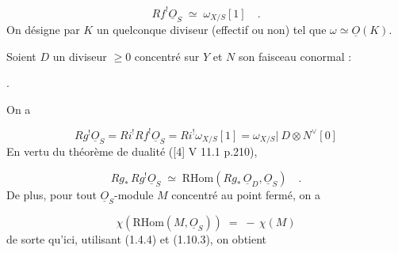 \begin{equation}\tag{1.10.1}
Rf^{!}\underline{O}_S \;\simeq\; \omega_{X/S}[1] \quad .
\end{equation}
On désigne par $K$ un quelconque diviseur (effectif ou non) tel que $\omega \simeq \underline{O}(K)$.

Soient $D$ un diviseur $\geq 0$ concentré sur $Y$ et $N$ son faisceau conormal :

\begin{center}
\quad .
\end{center}
On a

\begin{equation}\tag{1.10.2}
Rg^{!}\underline{O}_S = Ri^{!}Rf^{!}\underline{O}_S = Ri^{!}\omega_{X/S}[1] = \omega_{X/S}\big|\ D \otimes N^{\vee}[0]
\end{equation}
En vertu du théorème de dualité ([4] V 11.1 p.210),

\begin{equation}\tag{1.10.3}
Rg_{*}\, Rg^{!}\underline{O}_S \;\simeq\; \mathrm{RHom}(Rg_{*}\, \underline{O}_D,\underline{O}_S) \quad .
\end{equation}
De plus, pour tout $\underline{O}_S$-module $M$ concentré au point fermé, on a

\begin{equation}\tag{1.10.4}
\chi(\mathrm{RHom}(M,\underline{O}_S)) \;=\; -\,\chi(M)
\end{equation}
de sorte qu'ici, utilisant (1.4.4) et (1.10.3), on obtient

